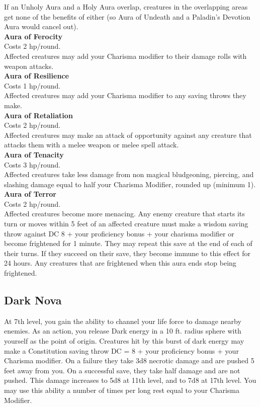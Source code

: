 \documentclass[10pt,twoside,twocolumn,openany]{book}
\begin{document}
If an Unholy Aura and a Holy Aura overlap, creatures in the overlapping areas get none of the benefits of either (so Aura of Undeath and a Paladin’s Devotion Aura would cancel out).\\
\textbf{Aura of Ferocity}\\
Costs 2 hp/round.\\
Affected creatures may add your Charisma modifier to their damage rolls with weapon attacks.\\
\textbf{Aura of Resilience}\\
Costs 1 hp/round.\\
Affected creatures may add your Charisma modifier to any saving throws they make.\\
\textbf{Aura of Retaliation}\\
Costs 2 hp/round.\\
Affected creatures may make an attack of opportunity against any creature that attacks them with a melee weapon or melee spell attack.\\
\textbf{Aura of Tenacity}\\
Costs 3 hp/round.\\
Affected creatures take less damage from non magical bludgeoning, piercing, and slashing damage equal to half your Charisma Modifier, rounded up (minimum 1).\\
\textbf{Aura of Terror}\\
Costs 2 hp/round.\\
Affected creatures become more menacing. Any enemy creature that starts its turn or moves within 5 feet of an affected creature must make a wisdom saving throw against DC 8 + your proficiency bonus + your charisma modifier or become frightened for 1 minute. They may repeat this save at the end of each of their turns. If they succeed on their save, they become immune to this effect for 24 hours. Any creatures that are frightened when this aura ends stop being frightened.

\subsection{Dark Nova}
At 7th level, you gain the ability to channel your life force to damage nearby enemies. As an action, you release Dark energy in a 10 ft. radius sphere with yourself as the point of origin. Creatures hit by this burst of dark energy may make a Constitution saving throw DC = 8 + your proficiency bonus + your Charisma modifier. On a failure they take 3d8 necrotic damage and are pushed 5 feet away from you. On a successful save, they take half damage and are not pushed. This damage increases to 5d8 at 11th level, and to 7d8 at 17th level. You may use this ability a number of times per long rest equal to your Charisma Modifier.
\end{document}
